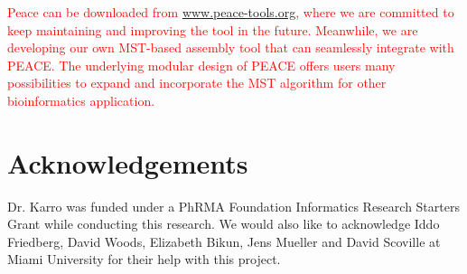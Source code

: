 \documentclass[a4,center,fleqn]{NAR}
\newcommand{\mc}[1]{\textcolor{red}{#1}}
\begin{document}
\mc{Peace can be downloaded from
\href{http://www.peace-tools.org}{www.peace-tools.org}, where we are
committed to keep maintaining and improving the tool in the future.
Meanwhile, we are developing our own MST-based assembly tool that can
seamlessly integrate with PEACE.  The underlying modular design of
PEACE offers users many possibilities to expand and incorporate the
MST algorithm for other bioinformatics application.}

\section{Acknowledgements}

Dr. Karro was funded under a PhRMA Foundation Informatics Research
Starters Grant while conducting this research.  We would also like to
acknowledge Iddo Friedberg, David Woods, Elizabeth Bikun, Jens Mueller and David
Scoville at Miami University for their help with this project.

\vspace{3mm}


\end{document}
